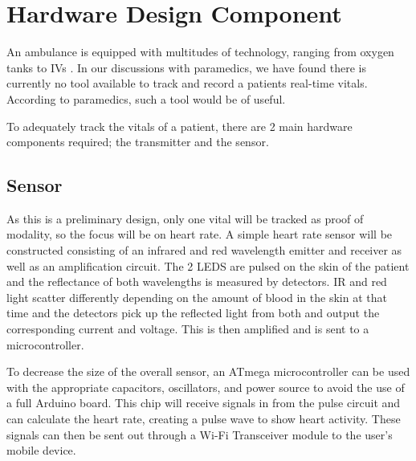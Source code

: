 
\section{Hardware Design Component}

An ambulance is equipped with multitudes of technology, ranging from oxygen tanks to IVs \cite{AmericanCollegeofSurgeonsCommitteeonTrauma}. In our discussions with paramedics, we have found there is currently no tool available to track and record a patients real-time vitals. According to paramedics, such a tool would be of useful.

To adequately track the vitals of a patient, there are 2 main hardware components required; the transmitter and the sensor.

\subsection{Sensor}
As this is a preliminary design, only one vital will be tracked as proof of modality, so the focus will be on heart rate.
A simple heart rate sensor will be constructed consisting of an infrared and red wavelength emitter and receiver as well as an amplification circuit.
The 2 LEDS are pulsed on the skin of the patient and the reflectance of both wavelengths is measured by detectors. IR and red light scatter differently
depending on the amount of blood in the skin at that time and the detectors pick up the reflected light from both and output the corresponding current and
voltage. This is then amplified and is sent to a microcontroller.

To decrease the size of the overall sensor, an ATmega microcontroller can be used with the appropriate capacitors, oscillators, and power source to avoid the
use of a full Arduino board. This chip will receive signals in from the pulse circuit and can calculate the heart rate, creating a pulse wave to show heart activity. These signals can then be sent out through a Wi-Fi Transceiver module to the user’s mobile device.
